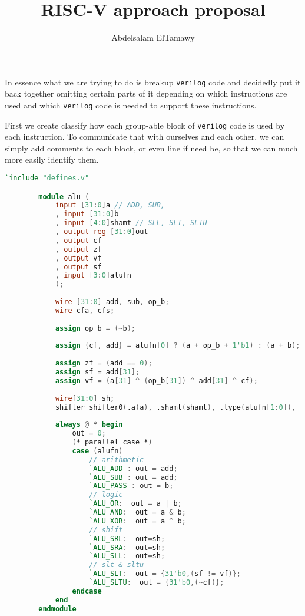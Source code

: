\documentclass[]{article}
\title{RISC-V approach proposal}
\author{Abdelsalam ElTamawy}
\begin{document}

	In essence what we are trying to do is breakup \verb|verilog| code and decidedly put it back together omitting certain parts of it depending on which instructions are used and which \verb|verilog| code is needed to support these instructions.

	First we create classify how each group-able block of \verb|verilog| code is used by each instruction. To communicate that with ourselves and each other, we can simply add comments to each block, or even line if need be, so that we can much more easily identify them.

	\begin{lstlisting}[language=verilog]
		`include "defines.v"

		module alu (
			input [31:0]a // ADD, SUB, 
			, input [31:0]b
			, input [4:0]shamt // SLL, SLT, SLTU
			, output reg [31:0]out
			, output cf
			, output zf
			, output vf
			, output sf
			, input [3:0]alufn
			);
		
			wire [31:0] add, sub, op_b;
			wire cfa, cfs;
			
			assign op_b = (~b);
			
			assign {cf, add} = alufn[0] ? (a + op_b + 1'b1) : (a + b);
			
			assign zf = (add == 0);
			assign sf = add[31];
			assign vf = (a[31] ^ (op_b[31]) ^ add[31] ^ cf);
			
			wire[31:0] sh;
			shifter shifter0(.a(a), .shamt(shamt), .type(alufn[1:0]),  .r(sh));
			
			always @ * begin
				out = 0;
				(* parallel_case *)
				case (alufn)
					// arithmetic
					`ALU_ADD : out = add;
					`ALU_SUB : out = add;
					`ALU_PASS : out = b;
					// logic
					`ALU_OR:  out = a | b;
					`ALU_AND:  out = a & b;
					`ALU_XOR:  out = a ^ b;
					// shift
					`ALU_SRL:  out=sh;
					`ALU_SRA:  out=sh;
					`ALU_SLL:  out=sh;
					// slt & sltu
					`ALU_SLT:  out = {31'b0,(sf != vf)};
					`ALU_SLTU:  out = {31'b0,(~cf)};
				endcase
			end
		endmodule
	\end{lstlisting}
\end{document}
